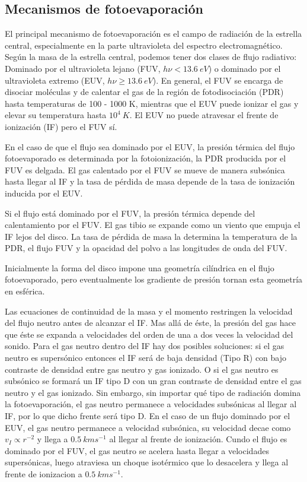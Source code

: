 \subsection{Mecanismos de fotoevaporación \citep{Johnstone:1998}}

El principal mecanismo de fotoevaporación es el campo de radiación de la
estrella central, especialmente en la parte ultravioleta del espectro
electromagnético. Según la masa de la estrella central, podemos tener dos
clases de flujo radiativo: Dominado por el ultravioleta lejano (FUV,
$h\nu < 13.6~eV$) o dominado por el ultravioleta extremo (EUV,
$h\nu \geq 13.6~eV$). En general, el FUV se encarga de disociar moléculas
y de calentar el gas de la región de fotodisociación (PDR) hasta
temperaturas de 100 - 1000 K, mientras que el EUV puede ionizar el gas y
elevar su temperatura hasta $10^4~K$. El EUV no puede atravesar el frente
de ionización (IF) pero el FUV sí.

En el caso de que el flujo sea dominado por el EUV, la presión térmica del
flujo fotoevaporado es determinada por la fotoionización, la PDR producida
por el FUV es delgada. El gas calentado por el FUV se mueve de manera
subsónica hasta llegar al IF y la tasa de pérdida de masa
depende de la tasa de ionización inducida por el EUV.

Si el flujo está dominado por el FUV, la presión térmica depende del
calentamiento por el FUV. El gas tibio se expande como un viento que empuja
el IF lejos del disco. La tasa de pérdida de masa la determina la temperatura
de la PDR, el flujo FUV y la opacidad del polvo a las longitudes de onda del FUV.

Inicialmente la forma del disco impone una geometría cilíndrica en el
flujo fotoevaporado, pero eventualmente los gradiente de presión tornan
esta geometría en esférica.

Las ecuaciones de continuidad de la masa y el momento restringen la velocidad
del flujo neutro antes de alcanzar el IF. Mas allá de éste, la presión del
gas hace que éste se expanda a velocidades del orden de una a dos veces la
velocidad del sonido. Para el gas neutro dentro del IF hay dos posibles
soluciones: si el gas neutro es supersónico entonces el IF será de baja
densidad (Tipo R) con bajo contraste de densidad entre gas neutro y
gas ionizado. O si el gas neutro es subsónico se formará un IF tipo D con un
gran contraste de densidad entre el gas neutro y el gas ionizado. Sin embargo,
sin importar qué tipo de radiación domina la fotoevaporación, el gas neutro
permanece a velocidades subsónicas al llegar al IF, por lo que dicho frente
será tipo D. 
En el caso de un flujo dominado por el EUV, el gas neutro permanece a
velocidad subsónica, su velocidad decae como $v_I \propto r^{-2}$ y llega
a $0.5~kms^{-1}$ al llegar al frente de ionización. Cundo el flujo es
dominado por el FUV, el gas neutro se acelera hasta llegar a velocidades
supersónicas, luego atraviesa un choque isotérmico que lo desacelera y
llega al frente de ionizacion a $0.5~kms^{-1}$.


